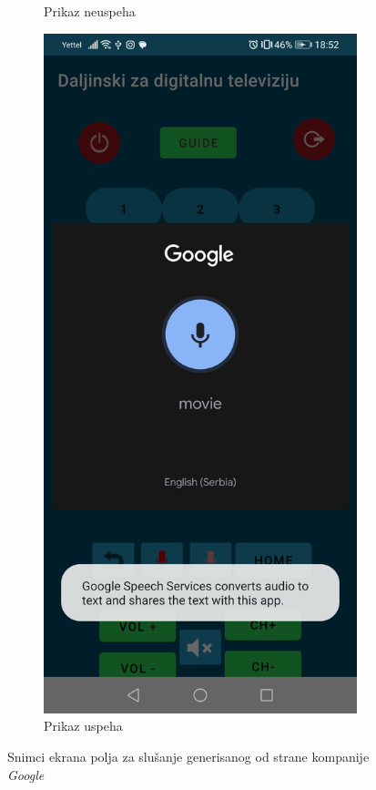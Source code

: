 \documentclass[implementacija.tex]{subfiles}
\begin{document}
\begin{figure}
\begin{subfigure}[b]{0.3\textwidth}
  \caption{Prikaz neuspeha}
  \label{fig:google_neuspesno}
    \end{subfigure}
    \hfill
    \begin{subfigure}[b]{0.3\textwidth}
        \centering
        \includegraphics[width=\textwidth,keepaspectratio]{Implementacija/snimci_ekrana/11_obican_google_uspesno.jpg}
  \caption{Prikaz uspeha}
   \label{fig:google_uspesno}
    \end{subfigure}
    \caption{Snimci ekrana polja za slušanje generisanog od strane kompanije \textit{Google}}
    \label{fig:obavestenja}
\end{figure}
\end{document}
